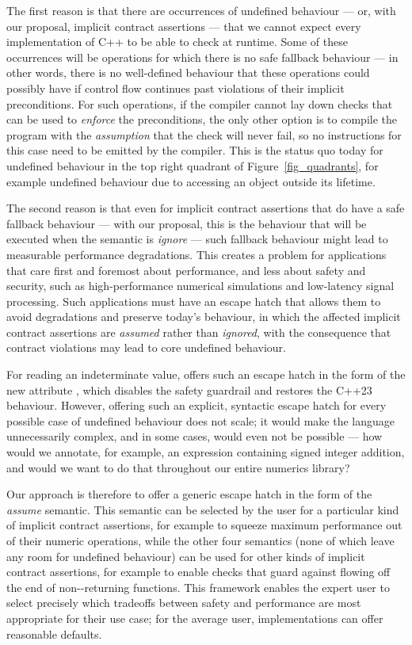 The first reason is that there are occurrences of undefined behaviour --- or, with our proposal, implicit contract assertions --- that we cannot expect every implementation of C++ to be able to check at runtime. Some of these occurrences will be operations for which there is no safe fallback behaviour --- in other words, there is no well-defined behaviour that these operations could possibly have if control flow continues past violations of their implicit preconditions. For such operations, if the compiler cannot lay down checks that can be used to \emph{enforce} the preconditions, the only other option is to compile the program with the \emph{assumption} that the check will never fail, so no instructions for this case need to be emitted by the compiler. This is the status quo today for undefined behaviour in the top right quadrant of Figure~\ref{fig_quadrants}, for example undefined behaviour due to accessing an object outside its lifetime.

The second reason is that even for implicit contract assertions that do have a safe fallback behaviour --- with our proposal, this is the behaviour that will be executed when the semantic is \emph{ignore} --- such fallback behaviour might lead to measurable performance degradations. This creates a problem for applications that care first and foremost about performance, and less about safety and security, such as high-performance numerical simulations and low-latency signal processing. Such applications must have an escape hatch that allows them to avoid degradations and preserve today's behaviour, in which the affected implicit contract assertions are \emph{assumed} rather than \emph{ignored}, with the consequence that contract violations may lead to core undefined behaviour.

For reading an indeterminate value, \cite{P2795R5} offers such an escape hatch in the form of the new attribute \tcode{[[indeterminate]]}, which disables the safety guardrail and restores the C++23 behaviour. However, offering such an explicit, syntactic escape hatch for every possible case of undefined behaviour does not scale; it would make the language unnecessarily complex, and in some cases, would even not be possible --- how would we annotate, for example, an expression containing signed integer addition, and would we want to do that throughout our entire numerics library? 

Our approach is therefore to offer a generic escape hatch in the form of the \emph{assume} semantic. This semantic can be selected by the user for a particular kind of implicit contract assertions, for example to squeeze maximum performance out of their numeric operations, while the other four semantics (none of which leave any room for undefined behaviour) can be used for other kinds of implicit contract assertions, for example to enable checks that guard against flowing off the end of non--returning functions. This framework enables the expert user to select precisely which tradeoffs between safety and performance are most appropriate for their use case; for the average user, implementations can offer reasonable defaults.


